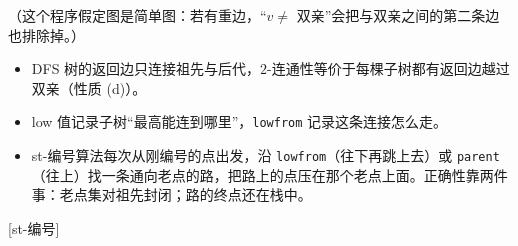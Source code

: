 （这个程序假定图是简单图：若有重边，“$v\neq$ 双亲”会把与双亲之间的第二条边也排除掉。）


\begin{itemize}
\item DFS 树的返回边只连接祖先与后代，$2$-连通性等价于每棵子树都有返回边越过双亲（性质 (d)）。
\item low 值记录子树“最高能连到哪里”，\texttt{lowfrom} 记录这条连接怎么走。
\item st-编号算法每次从刚编号的点出发，沿 \texttt{lowfrom}（往下再跳上去）或 \texttt{parent}（往上）找一条通向老点的路，把路上的点压在那个老点上面。正确性靠两件事：老点集对祖先封闭；路的终点还在栈中。
\end{itemize}

[st-编号]


